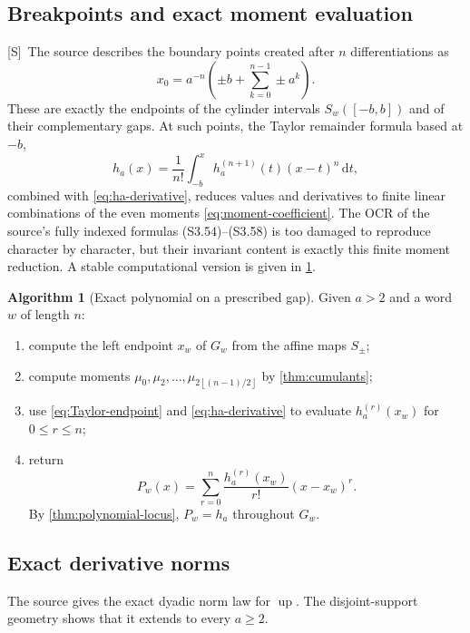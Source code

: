 \documentclass[11pt,oneside]{article}
\theoremstyle{definition}
\newtheorem{algorithm}[theorem]{Algorithm}
\theoremstyle{remark}
\newcommand{\Up}{\operatorname{up}}
\newcommand{\dd}{\,\mathrm d}
\newcommand{\floor}[1]{\left\lfloor #1\right\rfloor}
\newcommand{\Smark}{\textcolor{sourceblue}{\textsf{[S]}}}
\begin{document}
\subsection{Breakpoints and exact moment evaluation}

\Smark\ The source describes the boundary points created after $n$ differentiations as
\begin{equation}
 x_0=a^{-n}\left(\pm b+\sum_{k=0}^{n-1}\pm a^k\right).
 \tag{S3.50}
 \label{eq:source-breakpoints}
\end{equation}
These are exactly the endpoints of the cylinder intervals $S_w([-b,b])$ and of their
complementary gaps.  At such points, the Taylor remainder formula based at $-b$,
\begin{equation}
 h_a(x)=\frac1{n!}\int_{-b}^{x}h_a^{(n+1)}(t)(x-t)^n\dd t,
 \label{eq:Taylor-endpoint}
\end{equation}
combined with \eqref{eq:ha-derivative}, reduces values and derivatives to finite linear
combinations of the even moments \eqref{eq:moment-coefficient}.  The OCR of the source's
fully indexed formulas (S3.54)--(S3.58) is too damaged to reproduce character by character,
but their invariant content is exactly this finite moment reduction.  A stable computational
version is given in \cref{alg:gap-polynomial}.

\begin{algorithm}[Exact polynomial on a prescribed gap]
\label{alg:gap-polynomial}
Given $a>2$ and a word $w$ of length $n$:
\begin{enumerate}
\item compute the left endpoint $x_w$ of $G_w$ from the affine maps $S_\pm$;
\item compute moments $\mu_{0},\mu_2,\ldots,\mu_{2\floor{(n-1)/2}}$ by
      \cref{thm:cumulants};
\item use \eqref{eq:Taylor-endpoint} and \eqref{eq:ha-derivative} to evaluate
      $h_a^{(r)}(x_w)$ for $0\le r\le n$;
\item return
\[
 P_w(x)=\sum_{r=0}^{n}\frac{h_a^{(r)}(x_w)}{r!}(x-x_w)^r.
\]
By \cref{thm:polynomial-locus}, $P_w=h_a$ throughout $G_w$.
\end{enumerate}
\end{algorithm}

\subsection{Exact derivative norms}

The source gives the exact dyadic norm law for $\Up$.  The disjoint-support geometry shows
that it extends to every $a\ge2$.
\end{document}
